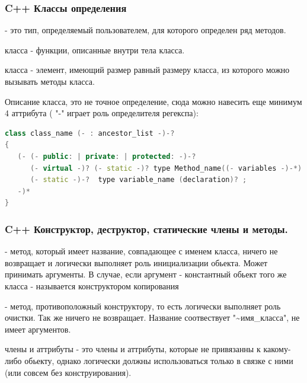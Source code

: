\documentclass[10pt,fullscreen=true, bookmarks=false]{beamer}
\begin{document}
\begin{frame}[fragile]
\frametitle{C++ Классы определения}

{} - это тип, определяемый пользователем, для которого определен ряд методов.

{ класса} - функции, описанные внутри тела класса.

{ класса} - элемент, имеющий размер равный размеру класса, из которого можно вызывать методы класса.

Описание класса, это не точное определение, сюда можно навесить еще минимум 4 аттрибута ( "-" играет роль определителя регекспа):
\begin{lstlisting}[language=C++,breaklines]
class class_name (- : ancestor_list -)-?
{
   (- (- public: | private: | protected: -)-?
	  (- virtual -)? (- static -)? type Method_name((- variables -)-*) (- definition | ; -)
	  (- static -)-?  type variable_name (declaration)? ;
   -)*
} 
\end{lstlisting}


\tableofcontents[pausesections]
\end{frame}


\begin{frame}[fragile]
\frametitle{C++ Конструктор, деструктор, статические члены и методы.}

{} - метод, который имеет название, совпадающее с именем класса, ничего не возвращает и логически выполняет роль инициализации обьекта. Может принимать аргументы. В случае, если аргумент - константный обьект того же класса - называется конструктором копирования

{} - метод, противоположный конструктору, то есть логически выполняет роль очистки. Так же ничего не возвращает. Название соотвествует "\textasciitilde имя\_класса", не имеет аргументов.

{ члены и аттрибуты} - это члены и аттрибуты, которые не привязанны к какому-либо обьекту, однако логически должны использоваться только в связке с ними (или совсем без конструирования).

\tableofcontents[pausesections]
\end{frame}
\end{document}
